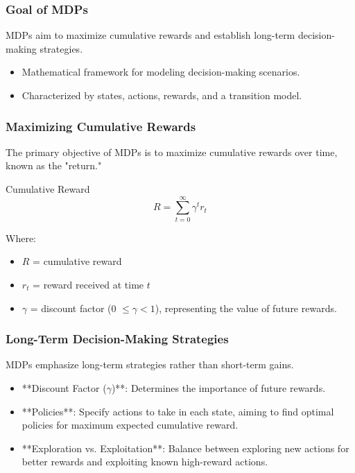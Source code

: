 \documentclass[aspectratio=169]{beamer}
\begin{document}
\begin{frame}[fragile]
    \frametitle{Goal of MDPs}
    MDPs aim to maximize cumulative rewards and establish long-term decision-making strategies.
    
    \begin{itemize}
        \item Mathematical framework for modeling decision-making scenarios.
        \item Characterized by states, actions, rewards, and a transition model.
    \end{itemize}
\end{frame}

\begin{frame}[fragile]
    \frametitle{Maximizing Cumulative Rewards}
    The primary objective of MDPs is to maximize cumulative rewards over time, known as the "return."

    \begin{block}{Cumulative Reward}
        \[
        R = \sum_{t=0}^{\infty} \gamma^t r_t
        \]
    \end{block}
    
    Where:
    \begin{itemize}
        \item \( R \) = cumulative reward
        \item \( r_t \) = reward received at time \( t \)
        \item \( \gamma \) = discount factor (0 \(\leq \gamma < 1\)), representing the value of future rewards.
    \end{itemize}
\end{frame}

\begin{frame}[fragile]
    \frametitle{Long-Term Decision-Making Strategies}
    MDPs emphasize long-term strategies rather than short-term gains.

    \begin{itemize}
        \item **Discount Factor (\( \gamma \))**: Determines the importance of future rewards.
        \item **Policies**: Specify actions to take in each state, aiming to find optimal policies for maximum expected cumulative reward.
        \item **Exploration vs. Exploitation**: Balance between exploring new actions for better rewards and exploiting known high-reward actions.
    \end{itemize}
\end{frame}
\end{document}
